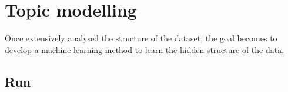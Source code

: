 \chapter{Topic modelling}\label{ch:topicmodelling}
Once extensively analysed the structure of the dataset, the goal becomes to develop a machine learning method to learn the hidden structure of the data.









\clearpage
\section{Run}


\clearpage


\clearpage



